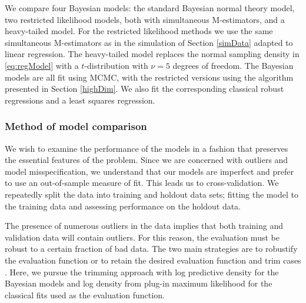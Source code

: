 \documentclass[ba]{imsart}
\def\bmu{\mbox{\boldmath $\mu$}}
\begin{document}

We compare four Bayesian models: the standard Bayesian normal theory model, two restricted likelihood models, both with simultaneous M-estimators, and a heavy-tailed model.  For the restricted likelihood methods we use the same simultaneous M-estimators as in the simulation of Section \ref{simData} adapted to linear regression.  The heavy-tailed model replaces the normal sampling density in \eqref{eq:regModel} with a $t$-distribution with $\nu = 5$ degrees of freedom. The Bayesian models are all fit using MCMC, with the restricted versions using the algorithm presented in Section \ref{highDim}. 
We also fit the corresponding classical robust regressions and a least squares regression.  

\subsubsection{Method of model comparison}
We wish to examine the performance of the models in a fashion that preserves the essential features of the 
problem.  Since we are concerned with outliers and model 
misspecification, we understand that our models are imperfect and prefer to use an out-of-sample measure of fit.  
This leads us to cross-validation.  We repeatedly split the data into training
and holdout data sets; fitting the model to the training data and assessing performance on the holdout data.  

The presence of numerous outliers in the data implies that both training and validation data will contain 
outliers.  For this reason, the evaluation must be robust to a certain fraction of bad data.  
The two main strategies are to robustify the evaluation function \citep[e.g.,][]{ronchetti1997} or 
to retain the desired evaluation function and trim cases \citep{jung2014}.  Here,
we pursue the trimming approach with log predictive density for the Bayesian models and log density from plug-in 
maximum likelihood for the classical fits used as the evaluation function.
\end{document}
